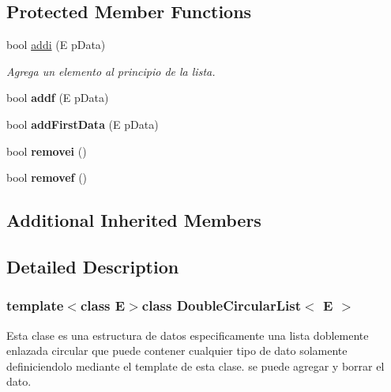 \subsection*{Protected Member Functions}
\begin{DoxyCompactItemize}
\item 
bool \hyperlink{class_double_circular_list_aee387acc4f53773302be4aa98bc779dc}{addi} (E p\-Data)
\begin{DoxyCompactList}\small\item\em Agrega un elemento al principio de la lista. \end{DoxyCompactList}\item 
\hypertarget{class_double_circular_list_a4a6ec7a7298470389b88b0c775a9bace}{bool {\bfseries addf} (E p\-Data)}\label{class_double_circular_list_a4a6ec7a7298470389b88b0c775a9bace}

\item 
\hypertarget{class_double_circular_list_aff5a0088509cc88dccfe31389d48f19e}{bool {\bfseries add\-First\-Data} (E p\-Data)}\label{class_double_circular_list_aff5a0088509cc88dccfe31389d48f19e}

\item 
\hypertarget{class_double_circular_list_a1d2c6f1fec95c8d2887c54cb3fc3ff84}{bool {\bfseries removei} ()}\label{class_double_circular_list_a1d2c6f1fec95c8d2887c54cb3fc3ff84}

\item 
\hypertarget{class_double_circular_list_a937da114318f91c6013dd4543636da9d}{bool {\bfseries removef} ()}\label{class_double_circular_list_a937da114318f91c6013dd4543636da9d}

\end{DoxyCompactItemize}
\subsection*{Additional Inherited Members}


\subsection{Detailed Description}
\subsubsection*{template$<$class E$>$class Double\-Circular\-List$<$ E $>$}

Esta clase es una estructura de datos especificamente una lista doblemente enlazada circular que puede contener cualquier tipo de dato solamente definiciendolo mediante el template de esta clase. se puede agregar y borrar el dato. 

